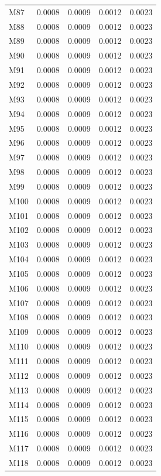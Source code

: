 \begin{longtable}{lrrrr}
M87 & 0.0008 & 0.0009 & 0.0012 & 0.0023 \\
M88 & 0.0008 & 0.0009 & 0.0012 & 0.0023 \\
M89 & 0.0008 & 0.0009 & 0.0012 & 0.0023 \\
M90 & 0.0008 & 0.0009 & 0.0012 & 0.0023 \\
M91 & 0.0008 & 0.0009 & 0.0012 & 0.0023 \\
M92 & 0.0008 & 0.0009 & 0.0012 & 0.0023 \\
M93 & 0.0008 & 0.0009 & 0.0012 & 0.0023 \\
M94 & 0.0008 & 0.0009 & 0.0012 & 0.0023 \\
M95 & 0.0008 & 0.0009 & 0.0012 & 0.0023 \\
M96 & 0.0008 & 0.0009 & 0.0012 & 0.0023 \\
M97 & 0.0008 & 0.0009 & 0.0012 & 0.0023 \\
M98 & 0.0008 & 0.0009 & 0.0012 & 0.0023 \\
M99 & 0.0008 & 0.0009 & 0.0012 & 0.0023 \\
M100 & 0.0008 & 0.0009 & 0.0012 & 0.0023 \\
M101 & 0.0008 & 0.0009 & 0.0012 & 0.0023 \\
M102 & 0.0008 & 0.0009 & 0.0012 & 0.0023 \\
M103 & 0.0008 & 0.0009 & 0.0012 & 0.0023 \\
M104 & 0.0008 & 0.0009 & 0.0012 & 0.0023 \\
M105 & 0.0008 & 0.0009 & 0.0012 & 0.0023 \\
M106 & 0.0008 & 0.0009 & 0.0012 & 0.0023 \\
M107 & 0.0008 & 0.0009 & 0.0012 & 0.0023 \\
M108 & 0.0008 & 0.0009 & 0.0012 & 0.0023 \\
M109 & 0.0008 & 0.0009 & 0.0012 & 0.0023 \\
M110 & 0.0008 & 0.0009 & 0.0012 & 0.0023 \\
M111 & 0.0008 & 0.0009 & 0.0012 & 0.0023 \\
M112 & 0.0008 & 0.0009 & 0.0012 & 0.0023 \\
M113 & 0.0008 & 0.0009 & 0.0012 & 0.0023 \\
M114 & 0.0008 & 0.0009 & 0.0012 & 0.0023 \\
M115 & 0.0008 & 0.0009 & 0.0012 & 0.0023 \\
M116 & 0.0008 & 0.0009 & 0.0012 & 0.0023 \\
M117 & 0.0008 & 0.0009 & 0.0012 & 0.0023 \\
M118 & 0.0008 & 0.0009 & 0.0012 & 0.0023 \\

\end{longtable}
